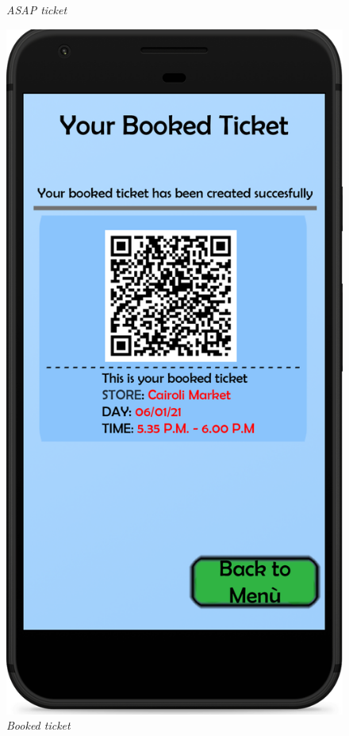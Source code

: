 \documentclass{article}
\begin{document}
\begin{figure}[!h]
\begin{minipage}[!h]{0.4\textwidth}
				\caption{\emph{ASAP ticket}}
			\end{minipage}
			\hfill
			\begin{minipage}[!h]{0.4\textwidth}
				\includegraphics[width=\textwidth]{../Mockups/BookedTicket.png}
				\caption{\emph{Booked ticket}}
			\end{minipage}
		\end{figure}
	
\end{document}
